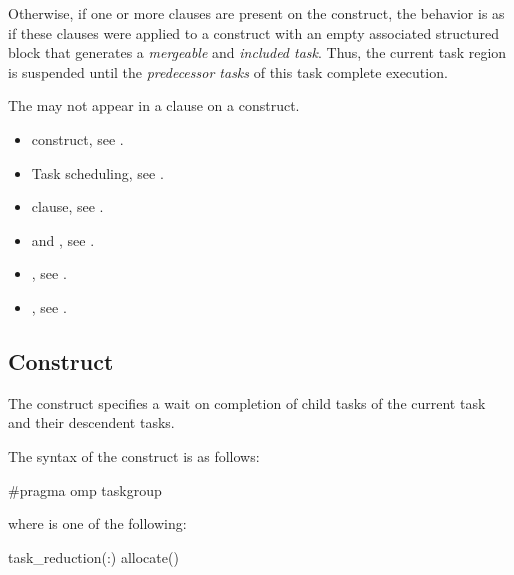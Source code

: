 Otherwise, if one or more  clauses are present on the
 construct, the behavior is as if these clauses were applied to
a  construct with an empty associated structured block that
generates a \emph{mergeable} and \emph{included task}. Thus, the current task region is
suspended until the \emph{predecessor tasks} of this task complete execution.


\restrictions

The   may not appear in a
 clause on a  construct.

\crossreferences
\begin{itemize}
\item {} construct, see .

\item Task scheduling, see
.

\item {} clause, see .

\item {} and , see
.

\item {}, see
.

\item {}, see
.

\end{itemize}







\subsection{ Construct}
\label{subsec:taskgroup Construct}
\summary
The  construct specifies a wait on completion of child tasks of the current
task and their descendent tasks.

\syntax
\begin{ccppspecific}
The syntax of the  construct is as follows:

\begin{ompcPragma}
#pragma omp taskgroup  
\end{ompcPragma}

where  is one of the following:

\begin{indentedcodelist}
task_reduction(:)
allocate(\plc{[allocator: ]})
\end{indentedcodelist}
\end{ccppspecific}

